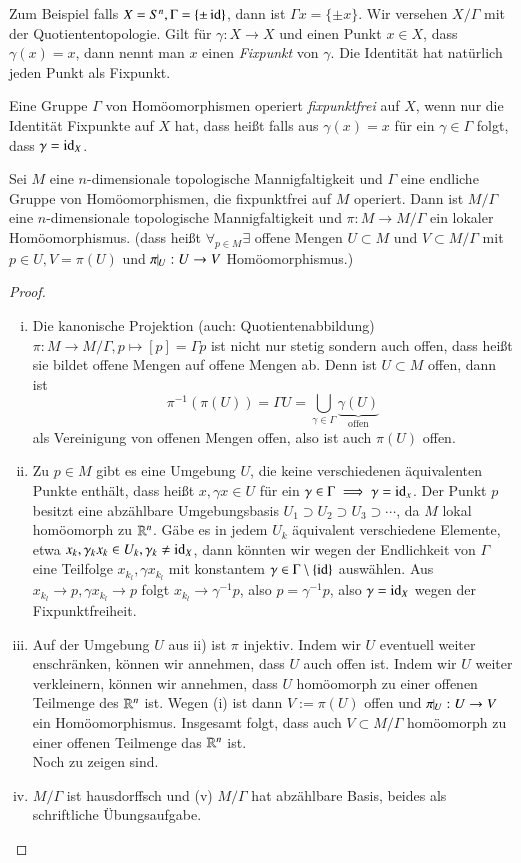 \documentclass[a4paper,10pt]{scrartcl}
\begin{document}
Zum Beispiel falls $X=S^n, \Gamma=\{\pm \operatorname{id}\}$, dann ist $\Gamma x=\{\pm x\}$. Wir versehen $X/\Gamma$ mit der Quotiententopologie. Gilt für $\gamma:X\to X$ und einen Punkt $x\in X$, dass $\gamma(x)=x$, dann nennt man $x$ einen \emph{Fixpunkt} von $\gamma$. Die Identität hat natürlich jeden Punkt als Fixpunkt.
\begin{df}
 Eine Gruppe $\Gamma$ von Homöomorphismen operiert \emph{fixpunktfrei} auf $X$, wenn nur die Identität Fixpunkte auf $X$ hat, dass heißt falls aus $\gamma (x)=x$ für ein $\gamma\in \Gamma$ folgt, dass $\gamma=\operatorname{id}_X$.
\end{df}
\begin{st}\label{thm:7.4}
 Sei $M$ eine $n$-dimensionale topologische Mannigfaltigkeit und $\Gamma$ eine endliche Gruppe von Homöomorphismen, 
die fixpunktfrei auf $M$ operiert. Dann ist $M/\Gamma$ eine $n$-dimensionale topologische Mannigfaltigkeit 
und $\pi:M\to M/\Gamma$ ein lokaler Homöomorphismus. (dass heißt $\forall_{p\in M} \exists$ offene Mengen $U\subset M$ und $V\subset M/\Gamma$ mit $p\in U, V=\pi(U)$ und $\pi\vline_U: U\to V$ Homöomorphismus.)
\end{st}
\begin{proof}
 \begin{enumerate}[(i)]
  \item Die kanonische Projektion (auch: Quotientenabbildung) $\pi:M\to M/\Gamma, p\mapsto [p]=\Gamma p$ ist nicht nur stetig sondern auch offen, dass heißt sie bildet offene Mengen auf offene Mengen ab. Denn ist $U\subset M$ offen, dann ist 
\[
 \pi^{-1}(\pi(U))=\Gamma U=\bigcup\limits_{\gamma\in \Gamma} \underbrace{\gamma(U)}_{\text{offen}}
\]
als Vereinigung von offenen Mengen offen, also ist auch $\pi(U)$ offen.
\item Zu $p\in M$ gibt es eine Umgebung $U$, die keine verschiedenen äquivalenten Punkte enthält, dass heißt $x,\gamma x\in U$ für ein $\gamma\in \Gamma \implies \gamma=\operatorname{id}_x$.
Der Punkt $p$ besitzt eine abzählbare Umgebungsbasis $U_1\supset U_2 \supset U_3 \supset\dotsb $, da $M$ lokal homöomorph zu $\mathbb{R}^n$. Gäbe es in jedem $U_k$ äquivalent verschiedene Elemente, etwa $x_k, \gamma_k x_k\in U_k, \gamma_k\neq \operatorname{id}_X$,
dann könnten wir wegen der Endlichkeit von $\Gamma$ eine Teilfolge $x_{k_l}, \gamma x_{k_l}$ mit konstantem $\gamma\in \Gamma\setminus\{\operatorname{id}\}$ auswählen. Aus $x_{k_l}\to p, \gamma x_{k_l}\to p$ folgt $x_{k_l} \to \gamma^{-1} p$, also $p=\gamma^{-1} p$, also $\gamma=\operatorname{id}_X$ wegen der Fixpunktfreiheit.
\item Auf der Umgebung $U$ aus ii) ist $\pi$ injektiv. Indem wir $U$ eventuell weiter enschränken, können wir annehmen, dass $U$ auch offen ist.  Indem wir $U$ weiter verkleinern, können wir annehmen, dass $U$ homöomorph zu einer offenen Teilmenge des $\mathbb{R}^n$ ist. Wegen (i) ist dann $V:=\pi(U)$ offen und $\pi\vline_U:U\to V$ ein Homöomorphismus.  Insgesamt folgt, dass auch $V\subset M/\Gamma$ homöomorph zu einer offenen Teilmenge das $\mathbb{R}^n$ ist. \\
Noch zu zeigen sind.
\item $M/\Gamma$ ist hausdorffsch und (v) $M/\Gamma$ hat abzählbare Basis, beides als schriftliche Übungsaufgabe.  
\end{enumerate}
\end{proof}
\end{document}
